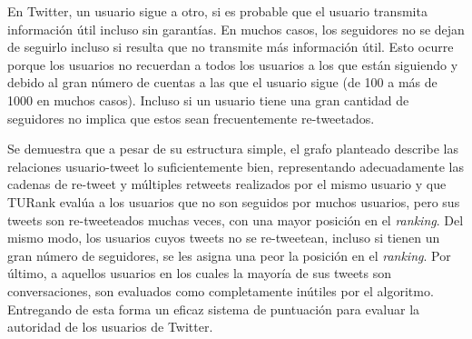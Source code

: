 En Twitter, un usuario sigue a otro, si es probable que el usuario transmita información útil incluso sin garantías. En muchos casos, los seguidores no se dejan de seguirlo incluso si resulta que no transmite  más información útil. Esto ocurre porque los usuarios no recuerdan a todos los usuarios a los que están siguiendo y debido al gran número de cuentas a las que el usuario sigue (de 100 a más de 1000 en muchos casos). Incluso si un usuario tiene una gran cantidad de seguidores no implica que estos sean frecuentemente re-tweetados.

Se demuestra que a pesar de su estructura simple, el grafo planteado describe las relaciones usuario-tweet lo suficientemente bien, representando adecuadamente las cadenas de re-tweet y múltiples retweets realizados por el mismo usuario y que TURank evalúa a los usuarios que no son seguidos por muchos usuarios, pero sus tweets son re-tweeteados muchas veces, con una mayor posición en el \emph{ranking}. Del mismo modo, los usuarios cuyos tweets no se re-tweetean, incluso si tienen un gran número de seguidores, se les asigna una peor la posición en el \emph{ranking}. Por último, a aquellos usuarios en los cuales la mayoría de sus tweets son conversaciones, son evaluados como completamente inútiles por el algoritmo. Entregando de esta forma un eficaz sistema de puntuación para evaluar la autoridad de los usuarios de Twitter.
